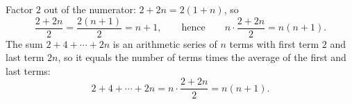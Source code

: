 Factor $2$ out of the numerator: $2+2n=2(1+n)$, so
\[\dfrac{2+2n}{2}=\dfrac{2(n+1)}{2}=n+1,\qquad\text{hence}\qquad n\cdot\dfrac{2+2n}{2}=n(n+1).\]
The sum $2+4+\cdots+2n$ is an arithmetic series of $n$ terms with first term $2$ and last term $2n$, so it equals the number of terms times the average of the first and last terms:
\[2+4+\cdots+2n=n\cdot\dfrac{2+2n}{2}=\boxed{n(n+1)}.\]
